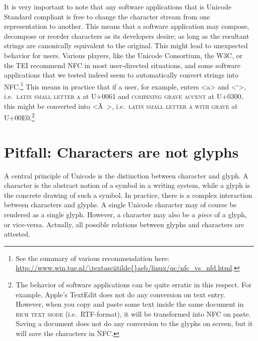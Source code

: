 It is very important to note that any software applications that is Unicode
Standard compliant is free to change the character stream from one
representation to another. This means that a software application may compose,
decompose or reorder characters as its developers desire; as long as the
resultant strings are canonically equivalent to the original. This might lead to
unexpected behavior for users. Various players, like the Unicode Consortium, the
W3C, or the TEI recommend NFC in most user-directed situations, and some
software applications that we tested indeed seem to automatically convert
strings into NFC.\footnote{See the summary of various recommendation here:
\url{http://www.win.tue.nl/\textasciitilde{}aeb/linux/uc/nfc\_vs\_nfd.html}.}
This means in practice that if a user, for example, enters <a> and <`>,
i.e.~\textsc{latin small letter a} at U+0061 and \textsc{combining grave accent}
at U+0300, this might be converted into <Ã >, i.e.~\textsc{latin small letter a
with grave} at U+00E0.\footnote{The behavior of software applications can be
quite erratic in this respect. For example, Apple's TextEdit does not do any
conversion on text entry. However, when you copy and paste some text inside the
same document in \textsc{rich text mode} (i.e.~RTF-format), it will be
transformed into NFC on paste. Saving a document does not do any conversion to
the glyphs on screen, but it will save the characters in NFC.}

\section{Pitfall: Characters are not glyphs}
\label{pitfall-characters-are-not-glyphs}

A central principle of Unicode is the distinction between character and glyph. A
character is the abstract notion of a symbol in a writing system, while a glyph
is the concrete drawing of such a symbol. In practice, there is a complex
interaction between characters and glyphs. A single Unicode character may of
course be rendered as a single glyph. However, a character may also be a
\textit{piece} of a glyph, or vice-versa. Actually, all possible relations
between glyphs and characters are attested.

